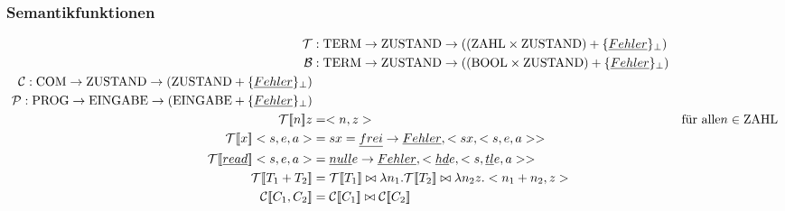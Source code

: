 \subsubsection{Semantikfunktionen}
\begin{align*}
\mathcal{T} &: \text{\lstinline!TERM!} \rightarrow \text{\lstinline!ZUSTAND!} \rightarrow ((\text{\lstinline!ZAHL!} \times \text{\lstinline!ZUSTAND!} ) + \{\underline{Fehler}\}_\perp)\\
\mathcal{B} &: \text{\lstinline!TERM!} \rightarrow \text{\lstinline!ZUSTAND!} \rightarrow ((\text{\lstinline!BOOL!} \times \text{\lstinline!ZUSTAND!} ) + \{\underline{Fehler}\}_\perp)\\
\mathcal{C} : \text{\lstinline!COM!} \rightarrow \text{\lstinline!ZUSTAND!} \rightarrow (\text{\lstinline!ZUSTAND!} + \{\underline{Fehler}\}_\perp)\\
\mathcal{P} : \text{\lstinline!PROG!} \rightarrow \text{\lstinline!EINGABE!} \rightarrow (\text{\lstinline!EINGABE!} + \{\underline{Fehler}\}_\perp)\\
\mathcal{T} [\![ n ]\!] z &= <n,z> & \text{für alle} n \in \text{\lstinline!ZAHL!}\\
\mathcal{T} [\![ x ]\!] <s,e,a> &= s x = \underline{frei} \rightarrow \underline{Fehler}, <sx, <s,e,a>>\\
\mathcal{T} [\![ \underline{read} ]\!] <s,e,a> &= \underline{null} e \rightarrow \underline{Fehler}, <\underline{hd} e, <s, \underline{tl} e, a>>\\
\mathcal{T} [\![ T_1 + T_2 ]\!]  &= \mathcal{T} [\![ T_1]\!]  \bowtie \lambda n_1.\mathcal{T} [\![ T_2 ]\!]  \bowtie \lambda n_2 z . <n_1 + n_2, z>\\
\mathcal{C} [\![ C_1, C_2 ]\!]  &= \mathcal{C} [\![ C_1]\!]  \bowtie \mathcal{C} [\![ C_2]\!]  
\end{align*}